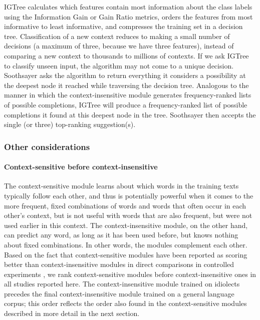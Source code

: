 \documentclass[12pt]{article}
\begin{document}
IGTree calculates which features contain most information about the class labels using the Information Gain or Gain Ratio metrics, orders the features from most informative to least informative, and compresses the training set in a decision tree. Classification of a new context reduces to making a small number of decisions (a maximum of three, because we have three features), instead of comparing a new context to thousands to millions of contexts. If we ask IGTree to classify unseen input, the algorithm may not come to a unique decision. Soothsayer asks the algorithm to return everything it considers a possibility at the deepest node it reached while traversing the decision tree. Analogous to the manner in which the context-insensitive module generates frequency-ranked lists of possible completions, IGTree will produce a frequency-ranked list of possible completions it found at this deepest node in the tree. Soothsayer then accepts the single (or three) top-ranking suggestion(s).

\subsubsection{Other considerations}

\paragraph{Context-sensitive before context-insensitive}

The context-sensitive module learns about which words in the training texts typically follow each other, and thus is potentially powerful when it comes to the more frequent, fixed combinations of words and words that often occur in each other's context, but is not useful with words that are also frequent, but were not used earlier in this context. The context-insensitive module, on the other hand, can predict any word, as long as it has been used before, but knows nothing about fixed combinations. In other words, the modules complement each other. Based on the fact that context-sensitive modules have been reported as scoring better than context-insensitive modules in direct comparisons in controlled experiments \cite{Lesher+99}, we rank context-sensitive modules before context-insensitive ones in all studies reported here. The context-insensitive module trained on idiolects precedes the final context-insensitive module trained on a general language corpus; this order reflects the order also found in the context-sensitive modules described in more detail in the next section.
\end{document}
